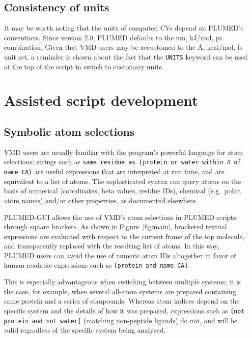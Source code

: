 \documentclass[preprint,review,11pt]{elsarticle}
\begin{document}
\subsection{Consistency of units}

It may be worth noting that the units of computed CVs depend on
PLUMED's conventions.  Since version 2.0, PLUMED defaults to the nm,
kJ/mol, ps combination. Given that VMD users may be accustomed to the
\AA, kcal/mol, fs unit set, a reminder is shown about the fact that
the \texttt{UNITS} keyword can be used at the top of the script to
switch to customary units.



\section{Assisted script development}


\subsection{Symbolic atom selections}\label{sec:symb-atom-select}

VMD users are usually familiar with the program's powerful language
for atom selections; strings such as \texttt{same residue as (protein
  or water within 4 of name CA)} are useful expressions that are
interpreted at run time, and are equivalent to a list of atoms.  The
sophisticated syntax can query atoms on the basis of numerical
(coordinates, beta values, residue IDs), chemical (e.g.\ polar, atom
names) and/or other properties, as documented
elsewhere~\cite{Humphrey_Dalke_Schulten_1996}.

PLUMED-GUI allows the use of VMD's atom selections in PLUMED scripts
through  square brackets. As shown in Figure~\ref{fig:main},
bracketed textual expressions  are evaluated with respect to
the current frame of the top molecule, and transparently replaced with the
resulting list of atoms. In this way, PLUMED users can 
avoid the use of numeric atom IDs altogether in favor of human-readable
expressions such as \texttt{[protein and name CA]}.

This is especially advantageous when switching between multiple
systems; it is the case, for example, when several all-atom systems
are prepared containing same protein and a series of compounds.
Whereas atom indices depend on the specific system and the details of
how it was prepared, expressions such as \texttt{[not protein
  and not water]} (matching non-peptide ligands) do not, and will be
valid regardless of the specific system being analyzed.
\end{document}
